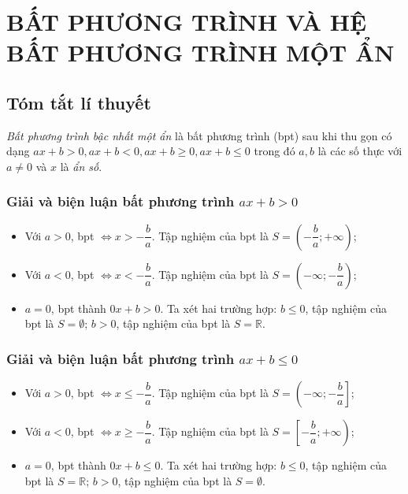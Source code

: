 \section{BẤT PHƯƠNG TRÌNH VÀ HỆ BẤT PHƯƠNG TRÌNH MỘT ẨN}
\subsection{Tóm tắt lí thuyết}
\begin{dn}
	{\it Bất phương trình bậc nhất một ẩn} là bất phương trình (bpt) sau khi thu gọn có dạng $ax+b>0, ax+b<0,ax+b \ge 0, ax+b \le 0$ trong đó $a,b$ là các số thực với $a \ne 0$ và $x$ là {\it ẩn số}.
\end{dn}

\subsubsection{Giải và biện luận bất phương trình $ax+b>0$}
\begin{itemize}
	\item Với $a >0$, bpt $\Leftrightarrow x > -\dfrac{b}{a}$. Tập nghiệm của bpt là $S= \left(-\dfrac{b}{a}; + \infty \right)$;
	\item Với $a <0$, bpt $\Leftrightarrow x < -\dfrac{b}{a}$. Tập nghiệm của bpt là $S= \left(-\infty ;-\dfrac{b}{a}\right)$;
	\item $a=0$, bpt thành $0x+b>0$. Ta xét hai trường hợp:
	\subitem $b \le 0$, tập nghiệm của bpt là $S = \emptyset$;
	\subitem $b >0$, tập nghiệm của bpt là $S = \mathbb{R}$.
\end{itemize}

\subsubsection{Giải và biện luận bất phương trình $ax+b \le 0$}
\begin{itemize}
	\item Với $a >0$, bpt $\Leftrightarrow x \le -\dfrac{b}{a}$. Tập nghiệm của bpt là $S= \left(-\infty; -\dfrac{b}{a}\right]$;
	\item Với $a <0$, bpt $\Leftrightarrow x \ge -\dfrac{b}{a}$. Tập nghiệm của bpt là $S= \left[-\dfrac{b}{a};+\infty \right)$;
	\item $a=0$, bpt thành $0x+b \le 0$. Ta xét hai trường hợp:
	\subitem $b \le 0$, tập nghiệm của bpt là $S = \mathbb{R}$;
	\subitem $b >0$, tập nghiệm của bpt là $S = \emptyset$.
\end{itemize}


